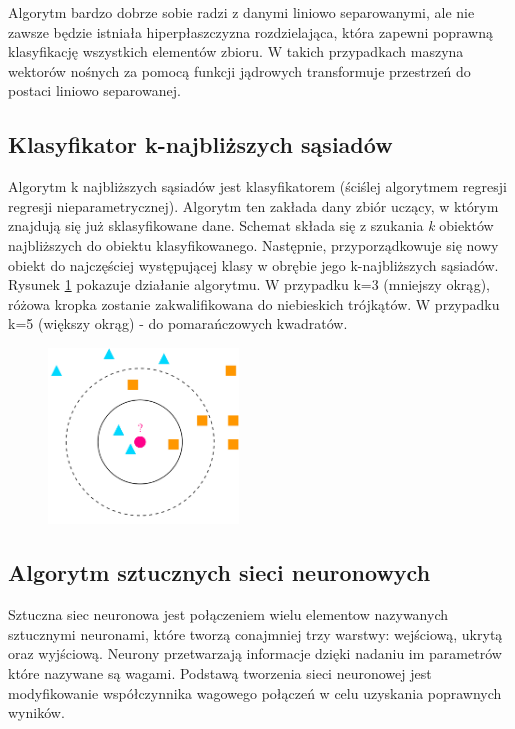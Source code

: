 \documentclass[a4paper,11pt]{article}
\begin{document}
Algorytm bardzo dobrze sobie radzi z danymi liniowo separowanymi, ale nie zawsze będzie istniała hiperpłaszczyzna rozdzielająca, która zapewni poprawną klasyfikację wszystkich elementów zbioru. W takich przypadkach maszyna wektorów nośnych za pomocą funkcji jądrowych transformuje przestrzeń do postaci liniowo separowanej.

\subsection{Klasyfikator k-najbliższych sąsiadów}
Algorytm k najbliższych sąsiadów jest klasyfikatorem (ściślej algorytmem regresji regresji nieparametrycznej). Algorytm ten zakłada dany zbiór uczący, w którym znajdują się już sklasyfikowane dane. Schemat składa się z szukania \textit{k} obiektów najbliższych do obiektu klasyfikowanego. Następnie, przyporządkowuje się nowy obiekt do najczęściej występującej klasy w obrębie jego k-najbliższych sąsiadów.\\

Rysunek \ref{fig:knn} pokazuje działanie algorytmu. W przypadku k=3 (mniejszy okrąg), różowa kropka zostanie zakwalifikowana do niebieskich trójkątów. W przypadku k=5 (większy okrąg) - do pomarańczowych kwadratów.

\begin{figure}[!htbp]
    	\centering
    	\includegraphics[width=0.45\textwidth]{images/knn.png}
    	\caption{}
    	\label{fig:knn}
\end{figure}

\subsection{Algorytm sztucznych sieci neuronowych}
Sztuczna siec neuronowa  jest połączeniem wielu elementow nazywanych sztucznymi neuronami, które tworzą conajmniej trzy warstwy: wejściową, ukrytą oraz wyjściową. Neurony przetwarzają informacje dzięki nadaniu im parametrów które nazywane są wagami. Podstawą tworzenia sieci neuronowej jest modyfikowanie współczynnika wagowego połączeń w celu uzyskania poprawnych wyników.
\end{document}
